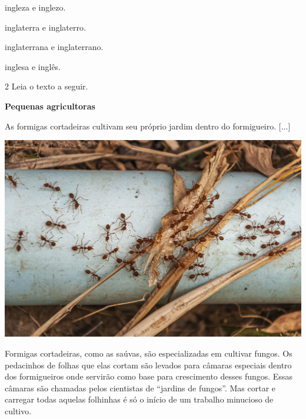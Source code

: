 \begin{escolha}
\item ingleza e inglezo.

\item inglaterra e inglaterro.

\item inglaterrana e inglaterrano.

\item inglesa e inglês.
\end{escolha}
\pagebreak

\num{2} Leia o texto a seguir. %

\begin{myquote}
\textbf{Pequenas agricultoras}

As formigas cortadeiras cultivam seu próprio jardim dentro do
formigueiro. {[}...{]}

\begin{center}
\includegraphics[width=\textwidth]{media/image6a.jpg}
\end{center}

Formigas cortadeiras, como as saúvas, são especializadas em cultivar
fungos. Os pedacinhos de folhas que elas cortam são levados para câmaras
especiais dentro dos formigueiros onde servirão como base para crescimento
desses fungos. Essas câmaras são chamadas pelos cientistas de ``jardins de
fungos''. Mas cortar e carregar todas aquelas folhinhas é só o início de um
trabalho minucioso de cultivo.

\end{myquote}

